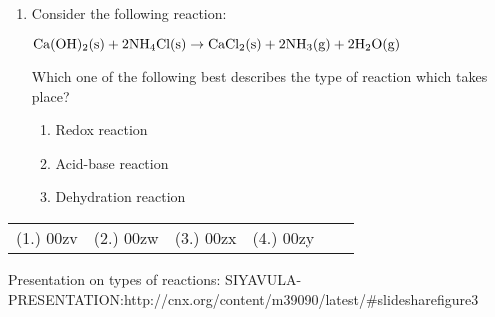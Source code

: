 {\begin{enumerate}
Is this reaction a substitution, addition or dehydration reaction? Give a reason for your answer.

\item{
Consider the following reaction:
\begin{center}
$\rm{Ca(OH)_{2}(s) + 2NH_{4}Cl (s) \rightarrow CaCl_{2}(s) + 2NH_{3}(g) + 2H_{2}O(g)}$
\end{center}

Which one of the following best describes the type of reaction which takes place?
\begin{enumerate}
\item{Redox reaction}
\item{Acid-base reaction}
\item{Dehydration reaction}
\end{enumerate}
}
\end{enumerate}
\practiceinfo

\begin{tabular}[h]{cccccc}
(1.) 00zv & (2.) 00zw & (3.) 00zx & (4.) 00zy & 
 \end{tabular}
}
Presentation on types of reactions: SIYAVULA-PRESENTATION:http://cnx.org/content/m39090/latest/#slidesharefigure3

